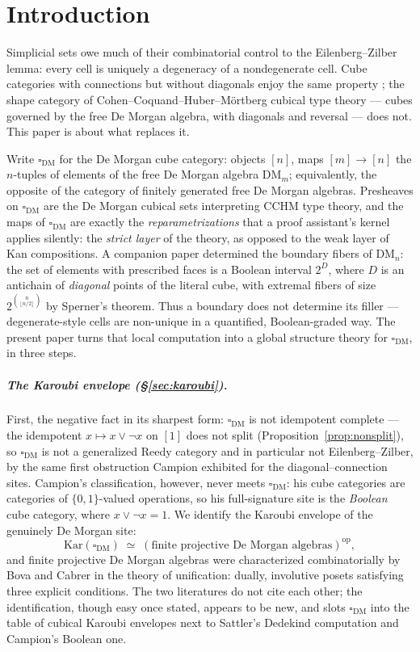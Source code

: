 \documentclass[11pt]{amsart}
\theoremstyle{definition}
\newcommand{\DM}{\mathrm{DM}}
\newcommand{\cube}{\square_{\mathrm{DM}}}
\newcommand{\Kar}{\mathrm{Kar}}
\begin{document}
\maketitle

\section{Introduction}
\label{sec:intro}

Simplicial sets owe much of their combinatorial control to the
Eilenberg--Zilber lemma: every cell is uniquely a degeneracy of a
nondegenerate cell.  Cube categories with connections but without
diagonals enjoy the same property \cite{Campion}; the shape category
of Cohen--Coquand--Huber--M\"ortberg cubical type theory
\cite{CCHM} --- cubes governed by the free De Morgan algebra, with
diagonals and reversal --- does not.  This paper is about what
replaces it.

Write $\cube$ for the De Morgan cube category: objects $[n]$, maps
$[m] \to [n]$ the $n$-tuples of elements of the free De Morgan
algebra $\DM_m$; equivalently, the opposite of the category of
finitely generated free De Morgan algebras.  Presheaves on $\cube$
are the De Morgan cubical sets interpreting CCHM type theory, and
the maps of $\cube$ are exactly the \emph{reparametrizations} that a
proof assistant's kernel applies silently: the \emph{strict layer}
of the theory, as opposed to the weak layer of Kan compositions.
A companion paper \cite{DMFibers} determined the boundary fibers of
$\DM_n$: the set of elements with prescribed faces is a Boolean
interval $2^{D}$, where $D$ is an antichain of \emph{diagonal}
points of the literal cube, with extremal fibers of size
$2^{\binom{n}{\lfloor n/2\rfloor}}$ by Sperner's theorem.  Thus a
boundary does not determine its filler --- degenerate-style cells
are non-unique in a quantified, Boolean-graded way.  The present
paper turns that local computation into a global structure theory
for $\cube$, in three steps.

\subparagraph*{The Karoubi envelope
  (\S\ref{sec:karoubi}).}  First, the negative fact in its sharpest
form: $\cube$ is not idempotent complete --- the idempotent
$x \mapsto x \vee \neg x$ on $[1]$ does not split
(Proposition~\ref{prop:nonsplit}), so $\cube$ is not a generalized
Reedy category and in particular not Eilenberg--Zilber, by the same
first obstruction Campion \cite{Campion} exhibited for the
diagonal--connection sites.  Campion's classification, however,
never meets $\cube$: his cube categories are categories of
$\{0,1\}$-valued operations, so his full-signature site is the
\emph{Boolean} cube category, where $x \vee \neg x = 1$.  We
identify the Karoubi envelope of the genuinely De Morgan site:
\[
  \Kar(\cube) \;\simeq\;
  (\text{finite projective De Morgan algebras})^{\mathrm{op}},
\]
and finite projective De Morgan algebras were characterized
combinatorially by Bova and Cabrer \cite{BovaCabrer} in the theory
of unification: dually, involutive posets satisfying three explicit
conditions.  The two literatures do not cite each other; the
identification, though easy once stated, appears to be new, and
slots $\cube$ into the table of cubical Karoubi envelopes next to
Sattler's Dedekind computation \cite{SattlerNote} and Campion's
Boolean one.
\end{document}
